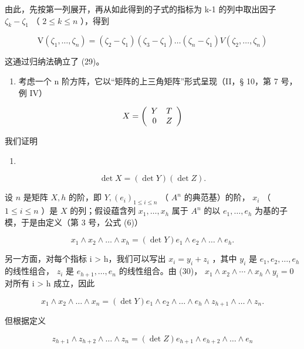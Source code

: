 由此，先按第一列展开，再从如此得到的子式的指标为 k-1 的列中取出因子 \(\zeta_{k}-\zeta_{1}\) （ \(2\leqslant k\leqslant n\) ），得到

\[
\mathrm{V} \left(\zeta_ {1}, \dots , \zeta_ {n}\right) = \left(\zeta_ {2} - \zeta_ {1}\right) \left(\zeta_ {3} - \zeta_ {1}\right) \dots \left(\zeta_ {n} - \zeta_ {1}\right) V \left(\zeta_ {2}, \dots , \zeta_ {n}\right)
\]

这通过归纳法确立了 (29)。

\begin{enumerate}
\def\labelenumi{(\arabic{enumi})}
\setcounter{enumi}{1}
\tightlist
\item
  考虑一个 n 阶方阵，它以“矩阵的上三角矩阵”形式呈现（II，§ 10，第 7 号，例 IV）
\end{enumerate}

\[
X = \left( \begin{array}{c c} Y & T \\ 0 & Z \end{array} \right)
\]

我们证明

\begin{enumerate}
\def\labelenumi{(\arabic{enumi})}
\setcounter{enumi}{29}
\tightlist
\item
\end{enumerate}

\[
\det X = (\det Y) (\det Z).
\]

设 \(n\) 是矩阵 \(X, h\) 的阶，即 \(Y, (e_i)_{1 \leqslant i \leqslant n}\) （ \(A^n\) 的典范基）的阶， \(x_i\) （ \(1 \leqslant i \leqslant n\) ）是 \(X\) 的列；假设蕴含列 \(x_1, \ldots, x_h\) 属于 \(A^n\) 的以 \(e_1, \ldots, e_h\) 为基的子模，于是由定义（第 3 号，公式 (6)）

\[
x _ {1} \wedge x _ {2} \wedge \dots \wedge x _ {h} = (\det Y) e _ {1} \wedge e _ {2} \wedge \dots \wedge e _ {h}.
\]

另一方面，对每个指标 i \textgreater{} h，我们可以写出 \(x_{i} = y_{i} + z_{i}\) ，其中 \(y_{i}\) 是 \(e_{1}, e_{2}, \ldots, e_{h}\) 的线性组合， \(z_{i}\) 是 \(e_{h+1}, \ldots, e_{n}\) 的线性组合。由 (30)， \(x_{1} \wedge x_{2} \wedge \cdots \wedge x_{h} \wedge y_{i} = 0\) 对所有 i \textgreater{} h 成立，因此

\[
x _ {1} \wedge x _ {2} \wedge \dots \wedge x _ {n} = (\det Y) e _ {1} \wedge e _ {2} \wedge \dots \wedge e _ {h} \wedge z _ {h + 1} \wedge \dots \wedge z _ {n}.
\]

但根据定义

\[
z _ {h + 1} \wedge z _ {h + 2} \wedge \dots \wedge z _ {n} = (\det Z) e _ {h + 1} \wedge e _ {h + 2} \wedge \dots \wedge e _ {n}
\]

